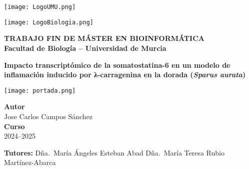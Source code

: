 \documentclass[10pt,a4paper]{article}
\begin{document}
\begin{titlepage}
  \centering
  \begin{minipage}[t]{0.48\textwidth}
    \raggedright
    \texttt{[image: LogoUMU.png]}
  \end{minipage}%
  \hfill
  \begin{minipage}[t]{0.48\textwidth}
    \raggedleft
    \texttt{[image: LogoBiologia.png]}
  \end{minipage}

  \vspace{2cm}

  {\fontsize{18pt}{22pt}\selectfont\textbf{TRABAJO FIN DE MÁSTER EN BIOINFORMÁTICA}\\[0.3em]}
   {\fontsize{16pt}{20pt}\bfseries\color{carmine}
     Facultad de Biología -- Universidad de Murcia
  }
  \vspace{1cm}
    
  {\fontsize{18pt}{22pt}\selectfont\bfseries
    Impacto transcriptómico de la somatostatina-6 en un modelo de inflamación inducido por λ-carragenina en la dorada (\textit{Sparus aurata})\\[0.5em]
  }
  
  \vspace{1cm}   %
  \begin{center}
    \texttt{[image: portada.png]}
  \end{center}
  \vspace{0.5cm}     %
  
{\fontsize{18pt}{22pt}\selectfont
    \textbf{Autor}\\
    Jose Carlos Campos Sánchez\\[1.5em]
    \textbf{Curso}\\[0.5em]
    2024--2025
  }
  \vspace{3em}

  {\fontsize{12pt}{14pt}\selectfont
    \textbf{Tutores:} Dña.\ María Ángeles Esteban Abad \quad\quad Dña.\ María Teresa Rubio Martínez‐Abarca
  }

  \vfill
\end{titlepage}
\end{document}
